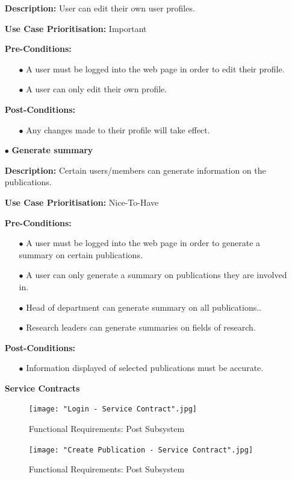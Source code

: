 \documentclass[a4paper,12pt]{article}
\begin{document}
\begin{itemize}
		\textbf{Description:} User can edit their own user profiles.\newline
	
		\textbf{Use Case Prioritisation:} Important\newline	

		\textbf{Pre-Conditions:}
		\begin{itemize}
			\item[$\bullet$]A user must be logged into the web page in order to edit their profile.
			\item[$\bullet$]A user can only edit their own profile.
			\\
		\end{itemize}
		\textbf{Post-Conditions: }
		\begin{itemize}
			\item[$\bullet$]Any changes made to their profile will take effect.
			\\
		\end{itemize}

		\newpage
		\item[$\bullet$]\textbf{Generate summary}\newline

		\textbf{Description:} Certain users/members can generate information on the publications.\newline
	
		\textbf{Use Case Prioritisation:} Nice-To-Have\newline

		\textbf{Pre-Conditions:}
		\begin{itemize}
			\item[$\bullet$]A user must be logged into the web page in order to generate a summary on certain publications.
			\item[$\bullet$]A user can only generate a summary on publications they are involved in.
			\item[$\bullet$]Head of department can generate summary on all publications..
			\item[$\bullet$]Research leaders can generate summaries on fields of research.
			\\
		\end{itemize}
		\textbf{Post-Conditions: }
		\begin{itemize}
			\item[$\bullet$]Information displayed of selected publications must be accurate.
			\\
		\end{itemize}
		\textbf{Service Contracts}
			\begin{figure}[H]
			\texttt{[image: "Login - Service Contract".jpg]}
			\caption{Functional Requirements: Post Subsystem \label{overflow}}
			\end{figure}

			\begin{figure}[H]
			\texttt{[image: "Create Publication - Service Contract".jpg]}
			\caption{Functional Requirements: Post Subsystem \label{overflow}}
			\end{figure}
			\end{itemize}
	
\end{document}
